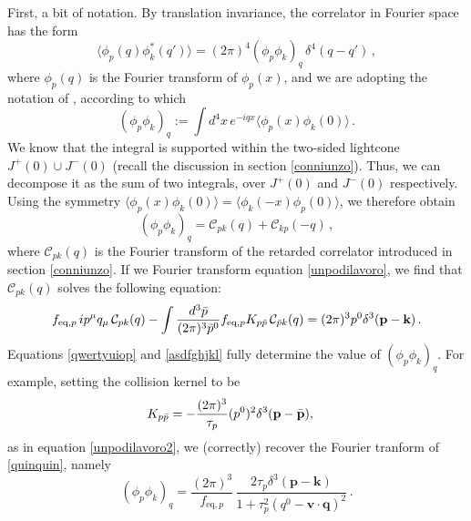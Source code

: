 \documentclass[aps,prd,preprint,nofootinbib,amsmath,amssymb,showpacs,longbibliography,singlecolumn,superscriptaddress,10pt]{revtex4-1}
\theoremstyle{plain}
\theoremstyle{definition}
\begin{document}
First, a bit of notation. By translation invariance, the correlator in Fourier space has the form
\begin{equation}
\label{eq:phi-corr-notation}
    \langle \phi_p(q) \phi_k^*(q') \rangle =(2\pi)^4 (\phi_p \phi_k)_q \, \delta^4(q-q') \, ,  
\end{equation}
where $\phi_p(q)$ is the Fourier transform of $\phi_p(x)$, and we are adopting the notation of \cite{landau_statistical_1980}, according to which
\begin{equation}
    (\phi_p\phi_k)_q := \int d^4 x \, e^{-iqx} \langle \phi_p(x) \phi_k(0) \rangle \, .
\end{equation}
We know that the integral is supported within the two-sided lightcone $J^+(0) \cup J^-(0)$ (recall the discussion in section \ref{conniunzo}). Thus, we can decompose it as the sum of two integrals, over $J^+(0)$ and $J^-(0)$ respectively. Using the symmetry $\langle \phi_p(x)\phi_k(0)\rangle = \langle \phi_k(-x)\phi_p(0)\rangle$, we therefore obtain
\begin{equation}\label{qwertyuiop}
    (\phi_p\phi_k)_q = \mathcal{C}_{pk}(q)+\mathcal{C}_{kp}(-q) \, ,
\end{equation}
where $\mathcal{C}_{pk}(q)$ is the Fourier transform of the retarded correlator introduced in section \ref{conniunzo}. If we Fourier transform equation \eqref{unpodilavoro}, we find that $\mathcal{C}_{pk}(q)$ solves the following equation:
\begin{equation}\label{asdfghjkl}
f_{\text{eq},p} \, ip^\mu q_\mu \, \mathcal{C}_{pk}(q)-\int \dfrac{d^3 \Bar{p}}{(2\pi)^3 \Bar{p}^0} f_{\text{eq},p} K_{p\Bar{p}} \,  \mathcal{C}_{\Bar{p}k}(q)= (2\pi)^3 p^0 \delta^3(\textbf{p}-\textbf{k}) \, .
\end{equation}
Equations \eqref{qwertyuiop} and \eqref{asdfghjkl} fully determine the value of $(\phi_p\phi_k)_q$. For example, setting the collision kernel to be
\begin{equation}
\begin{aligned}
&
K_{p\Bar{p}}=-\frac{(2\pi)^3}{\tau_p}(p^0)^2 \delta^3(\textbf{p}-\Bar{\textbf{p}}),
\end{aligned}    
\end{equation}
as in equation \eqref{unpodilavoro2}, we (correctly) recover the Fourier tranform of \eqref{quinquin}, namely
\begin{equation}
\label{eq:phi-corr-RTA-final}
    (\phi_p\phi_k)_q = \dfrac{(2\pi)^3}{f_{\text{eq},p}} \, \dfrac{2\tau_p \delta^3(\textbf{p}-\textbf{k})}{1+\tau^2_p(q^0-\textbf{v}\cdot \textbf{q})^2}  \, .
\end{equation}
\end{document}

